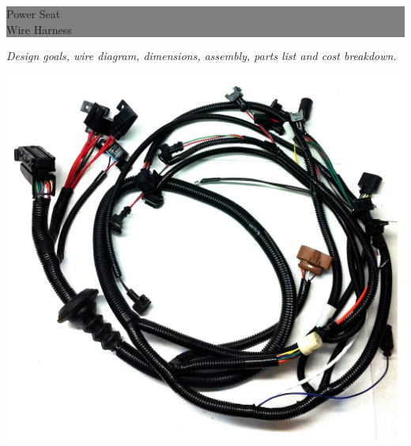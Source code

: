 \documentclass[12pt,letterpaper]{article}
\begin{document}
\newcommand{\getx}[1] {\StrBetween{#1}{(}{,}}
\newcommand{\gety}[1] {\StrBetween{#1}{,}{)}}
\def\mydef#1#2{\def#1{#2}}
\def\uncoord#1#2#3{\def#2{\getx{#1}}\def#3{\gety{#1}}}

\newcommand{\busline}[2] {\draw[thick] #1--#2;}


\begin{titlepage} %
	
	
	\colorbox{grey}{
		\parbox[t]{0.93\textwidth}{ %
			\parbox[t]{0.91\textwidth}{ %
				\raggedleft %
				\fontsize{50pt}{50pt}\selectfont %
				\vspace{0.7cm} %
				
				Power Seat \\ 
				Wire Harness\\
				
				\vspace{0.7cm} %
			}
		}
	}

	\parbox[t]{0.93\textwidth}{
		\raggedleft
	    \vspace{0.7cm}
		\textit{Design goals, wire diagram, dimensions, assembly, parts list and cost breakdown.}
	}
	\center
    \includegraphics[width=0.70\linewidth]{wireharness.jpg}


\end{titlepage}
\end{document}
